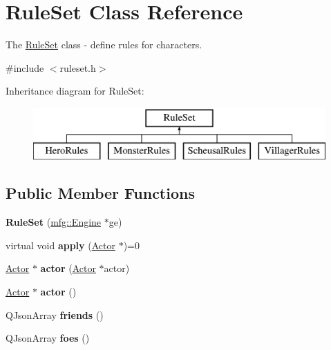 \hypertarget{class_rule_set}{}\section{Rule\+Set Class Reference}
\label{class_rule_set}


The \hyperlink{class_rule_set}{Rule\+Set} class -\/ define rules for characters.  




{\ttfamily \#include $<$ruleset.\+h$>$}

Inheritance diagram for Rule\+Set\+:\begin{figure}[H]
\begin{center}
\leavevmode
\includegraphics[height=2.000000cm]{class_rule_set}
\end{center}
\end{figure}
\subsection*{Public Member Functions}
\begin{DoxyCompactItemize}
\item 
\mbox{\label{class_rule_set_af7f8610fe8222f6f72a3c1745fa53548}} 
{\bfseries Rule\+Set} (\hyperlink{classmfg_1_1_engine}{mfg\+::\+Engine} $\ast$ge)
\item 
\mbox{\label{class_rule_set_a9666dd442a664846c558a10403f22a89}} 
virtual void {\bfseries apply} (\hyperlink{class_actor}{Actor} $\ast$)=0
\item 
\mbox{\label{class_rule_set_a48232bc120a79ee41ab79b63a3825b37}} 
\hyperlink{class_actor}{Actor} $\ast$ {\bfseries actor} (\hyperlink{class_actor}{Actor} $\ast$actor)
\item 
\mbox{\label{class_rule_set_ac1c666adae22de45e62636ba423cc60c}} 
\hyperlink{class_actor}{Actor} $\ast$ {\bfseries actor} ()
\item 
\mbox{\label{class_rule_set_aecfc0deb351d3a86c2a2a4321bb7002c}} 
Q\+Json\+Array {\bfseries friends} ()
\item 
\mbox{\label{class_rule_set_abc260d8a6e24ad6f075f1360f94760d5}} 
Q\+Json\+Array {\bfseries foes} ()
\end{DoxyCompactItemize}
